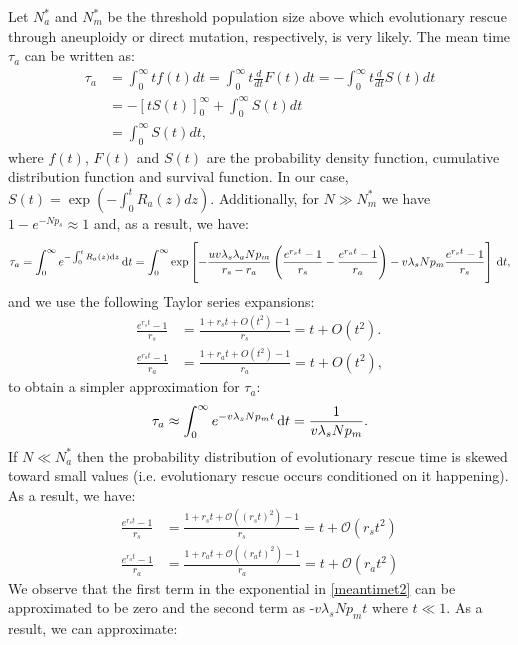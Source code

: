 \documentclass[12pt]{extarticle}
\renewcommand{\d}[1]{\ensuremath{\operatorname{d}\!{#1}}}
\renewcommand{\d}{{\rm d}}
\newcommand{\e}{e}
\renewcommand{\Delta}{r}
\begin{document}
\begin{appendices}
Let $N_a^*$ and $N_m^*$ be the threshold population size above which evolutionary rescue through aneuploidy or direct mutation, respectively, is very likely. The mean time $\tau_a$ can be written as: %
\begin{align*}
\tau_a&=\int_0^\infty tf(t)dt=\int_0^\infty t\frac{d}{dt}F(t)dt=-\int_0^\infty t\frac{d}{dt}S(t)dt\\
&=-\left[tS(t)\right]_0^\infty+\int_0^\infty S(t)dt\\
&=\int_0^\infty S(t)dt,
\end{align*}
where $f(t)$, $F(t)$ and $S(t)$ are the probability density function, cumulative distribution function and survival function.
In our case, $S(t)=\exp\left(-\int_0^t R_a(z)dz\right)$.
Additionally, for $N\gg N_m^*$ we have $1-\e^{-Np_s}\approx1$ and, as a result, we have: %
\begin{align*}
\tau_a=\int_0^\infty\e^{-\int_0^t R_a\left(z\right)\d z}\,\d t=\int_0^\infty\exp\left[-\frac{uv\lambda_s\lambda_aNp_m}{\Delta_s-\Delta_a}\left(\frac{\e^{\Delta_s t}-1}{\Delta_s}-\frac{\e^{\Delta_a t}-1}{\Delta_a}\right)-v\lambda_sNp_m\frac{\e^{\Delta_s t}-1}{\Delta_s}\right]\,\d t,
\end{align*} %
and we use the following Taylor series expansions:
\begin{align*}
\frac{\e^{\Delta_s t}-1}{\Delta_s}&=\frac{1+\Delta_s t+O(t^2)-1}{\Delta_s}=t+O(t^2).\\ %
\frac{\e^{\Delta_a t}-1}{\Delta_a}&=\frac{1+\Delta_a t+O(t^2)-1}{\Delta_a}=t+O(t^2), %
\end{align*}
to obtain a simpler approximation for $\tau_a$:
\begin{align}\label{limitapprox3}
\tau_a\approx\int_0^\infty\e^{-v\lambda_sNp_m t}\,\d t=\frac{1}{v\lambda_sNp_m}. %
\end{align}
If $N\ll N_a^*$ then the probability distribution of evolutionary rescue time is skewed toward small values (i.e. evolutionary rescue occurs conditioned on it happening). As a result, we have: 
\begin{align*}
\frac{\e^{\Delta_s t}-1}{\Delta_s}&=\frac{1+\Delta_s t+\mathcal{O}\left(\left(\Delta_st\right)^2\right)-1}{\Delta_s}=t+\mathcal{O}\left(\Delta_st^2\right)\\
\frac{\e^{\Delta_a t}-1}{\Delta_a}&=\frac{1+\Delta_a t+\mathcal{O}\left(\left(\Delta_at\right)^2\right)-1}{\Delta_a}=t+\mathcal{O}\left(\Delta_at^2\right)
\end{align*}
We observe that the first term in the exponential in \cref{meantimet2} can be approximated to be zero and the second term as -$v\lambda_sNp_mt$ where $t\ll1$. As a result, we can approximate:

\end{appendices}
\end{document}
